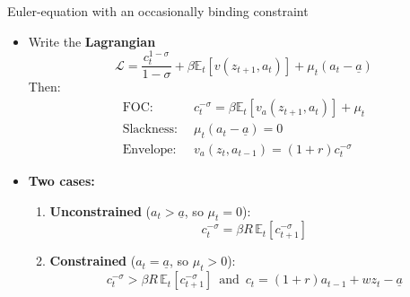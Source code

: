 \documentclass[
  10pt,
  ignorenonframetext,
  aspectratio=43,
  english,
]{beamer}
\providecommand{\tightlist}{%
  \setlength{\itemsep}{0pt}\setlength{\parskip}{0pt}}
\begin{document}
\begin{frame}{Euler-equation with an occasionally binding constraint}
\protect{}\label{euler-equation-with-an-occasionally-binding-constraint}
\begin{itemize}
\item
  Write the \textbf{Lagrangian} \[
    \mathcal{L}=\frac{c_{t}^{1-\sigma}}{1-\sigma}  +\beta \mathbb{E}_{t}\left[v(z_{t+1},a_{t})\right]+\mu_{t}(a_{t}-\underline{a})
    \] Then: \[
    \begin{aligned}
    \text{FOC:} & \,\,\,c^{-\sigma}_{t}=\beta\mathbb{E}_{t}\left[v_{a}(z_{t+1},a_{t})\right]+\mu_{t}\\
    \text{Slackness:} & \,\,\,\mu_{t}\left(a_{t}-\underline{a}\right)=0\\
    \text{Envelope:} & \,\,\,v_{a}(z_{t},a_{t-1})=(1+r)c^{-\sigma}_{t}
    \end{aligned}
    \]
\item
  \textbf{Two cases:}

  \begin{enumerate}
  \tightlist
  \item
    \textbf{Unconstrained} (\(a_{t}>\underline{a}\), so \(\mu_{t}=0\)):
    \[
     c^{-\sigma}_{t}=\beta R\,\mathbb{E}_{t}\left[c^{-\sigma}_{t+1}\right]
     \]
  \item
    \textbf{Constrained} (\(a_{t}=\underline{a}\), so \(\mu_{t}>0\)): \[
     c^{-\sigma}_{t}>\beta R\,\mathbb{E}_{t}\left[c^{-\sigma}_{t+1}\right]\,\,\,\text{and}\,\,\,c_{t}=(1+r)a_{t-1}+wz_{t}-\underline{a}
     \]
  \end{enumerate}
\end{itemize}
\end{frame}
\end{document}
